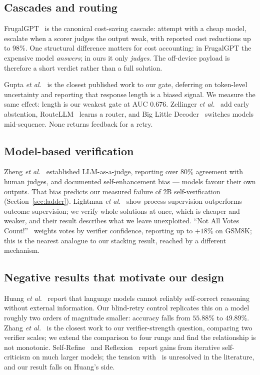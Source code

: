 \documentclass[conference]{IEEEtran}
\begin{document}
\subsection{Cascades and routing}

FrugalGPT~\cite{chen2023frugalgpt} is the canonical cost-saving cascade: attempt with a
cheap model, escalate when a scorer judges the output weak, with reported cost reductions
up to $98\%$. One structural difference matters for cost accounting: in FrugalGPT the
expensive model \emph{answers}; in ours it only \emph{judges}. The off-device payload is
therefore a short verdict rather than a full solution.

Gupta \textit{et al.}~\cite{gupta2024cascades} is the closest published work to our gate,
deferring on token-level uncertainty and reporting that response length is a biased
signal. We measure the same effect: length is our weakest gate at AUC $0.676$. Zellinger
\textit{et al.}~\cite{zellinger2025abstention} add early abstention,
RouteLLM~\cite{ong2024routellm} learns a router, and Big Little
Decoder~\cite{kim2023bild} switches models mid-sequence. None returns feedback for a
retry.

\subsection{Model-based verification}

Zheng \textit{et al.}~\cite{zheng2023judge} established LLM-as-a-judge, reporting over
$80\%$ agreement with human judges, and documented self-enhancement bias --- models favour
their own outputs. That bias predicts our measured failure of 2B self-verification
(Section~\ref{sec:ladder}). Lightman \textit{et al.}~\cite{lightman2023verify} show
process supervision outperforms outcome supervision; we verify whole solutions at once,
which is cheaper and weaker, and their result describes what we leave unexploited. ``Not
All Votes Count!''~\cite{notallvotes2024} weights votes by verifier confidence, reporting
up to $+18\%$ on GSM8K; this is the nearest analogue to our stacking result, reached by a
different mechanism.

\subsection{Negative results that motivate our design}

Huang \textit{et al.}~\cite{huang2024selfcorrect} report that language models cannot
reliably self-correct reasoning without external information. Our blind-retry control
replicates this on a model roughly two orders of magnitude smaller: accuracy falls from
$55.88\%$ to $49.89\%$. Zhang \textit{et al.}~\cite{zhang2024strongverifiers} is the
closest work to our verifier-strength question, comparing two verifier scales; we extend
the comparison to four rungs and find the relationship is not monotonic.
Self-Refine~\cite{madaan2023selfrefine} and Reflexion~\cite{shinn2023reflexion} report
gains from iterative self-criticism on much larger models; the tension
with~\cite{huang2024selfcorrect} is unresolved in the literature, and our result falls on
Huang's side.
\end{document}
